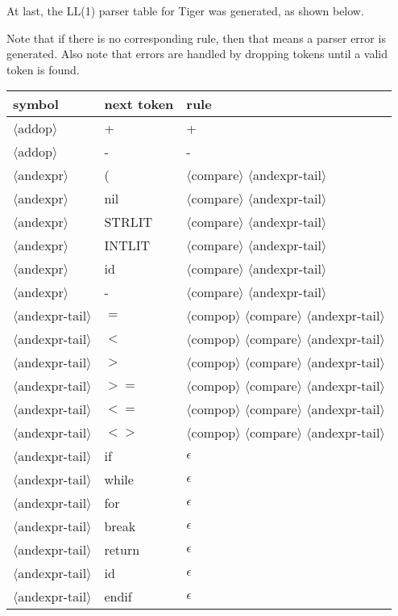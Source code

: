 \documentclass[11pt, fleqn]{article}
\newcommand{\atag}[1]{$\langle$#1$\rangle$}
\begin{document}
At last, the LL(1) parser table for Tiger was generated, as shown below.

Note that if there is no corresponding rule, then that means a parser error is generated.
Also note that errors are handled by dropping tokens until a valid token is found.

\begin{longtable}{l|l|l}
symbol							&	next token	&	rule									\\
\hline
\atag{addop}						&	+			&	+									\\
\atag{addop}						&	-			&	-									\\
\atag{andexpr} 					&	(			&	\atag{compare} \atag{andexpr-tail}	\\
\atag{andexpr} 					&	nil			&	\atag{compare} \atag{andexpr-tail}	\\
\atag{andexpr} 					&	STRLIT		&	\atag{compare} \atag{andexpr-tail}	\\
\atag{andexpr} 					&	INTLIT		&	\atag{compare} \atag{andexpr-tail}	\\
\atag{andexpr} 					&	id			&	\atag{compare} \atag{andexpr-tail}	\\
\atag{andexpr} 					&	-			&	\atag{compare} \atag{andexpr-tail}	\\
\atag{andexpr-tail}				&	$=$			&	\atag{compop} \atag{compare} \atag{andexpr-tail}	\\
\atag{andexpr-tail}				&	$<$			&	\atag{compop} \atag{compare} \atag{andexpr-tail}	\\
\atag{andexpr-tail}				&	$>$			&	\atag{compop} \atag{compare} \atag{andexpr-tail}	\\
\atag{andexpr-tail}				&	$>=$			&	\atag{compop} \atag{compare} \atag{andexpr-tail}	\\
\atag{andexpr-tail}				&	$<=$			&	\atag{compop} \atag{compare} \atag{andexpr-tail}	\\
\atag{andexpr-tail}				&	$<>$			&	\atag{compop} \atag{compare} \atag{andexpr-tail}	\\
\atag{andexpr-tail}				&	if			&	$\epsilon$	\\
\atag{andexpr-tail}				&	while		&	$\epsilon$	\\
\atag{andexpr-tail}				&	for			&	$\epsilon$	\\
\atag{andexpr-tail}				&	break		&	$\epsilon$	\\
\atag{andexpr-tail}				&	return		&	$\epsilon$	\\
\atag{andexpr-tail}				&	id			&	$\epsilon$	\\
\atag{andexpr-tail}				&	endif		&	$\epsilon$	\\

\end{longtable}
\end{document}
